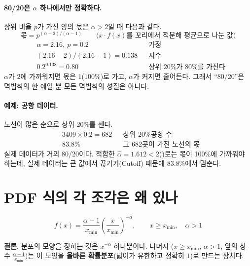 \documentclass[11pt]{article}
\newcommand{\term}[1]{\textbf{#1}}
\begin{document}
\paragraph{80/20은 $\alpha$ 하나에서만 정확하다.} 상위 비율 $p$가 가진 양의 몫은
$\alpha > 2$일 때 다음과 같다.
\[
  \text{몫} = p^{(\alpha-2)/(\alpha-1)}
  \qquad \text{($x \cdot f(x)$를 꼬리에서 적분해 평균으로 나눈 값)}
\]
\begin{align*}
  &\alpha = 2.16,\ p = 0.2              && \text{가정}\\
  &(2.16-2)/(2.16-1) = 0.138            && \text{지수}\\
  &0.2^{0.138} = 0.80                   && \text{상위 20\%가 80\%를 가진다}
\end{align*}
$\alpha$가 $2$에 가까워지면 몫은 $1$(100\%)로 가고, $\alpha$가 커지면 줄어든다.
그래서 ``80/20''은 멱법칙의 한 예일 뿐 모든 멱법칙의 성질은 아니다.

\paragraph{예제: 공항 데이터.} 노선이 많은 순으로 상위 20\%를 센다.
\begin{align*}
  &3409 \times 0.2 = 682          && \text{상위 20\% 공항 수}\\
  &83.8\%                         && \text{그 682곳이 가진 노선의 몫}
\end{align*}
실제 데이터가 거의 80/20이다. 적합한 $\hat\alpha = 1.612 < 2$()로는
몫이 100\%에 가까워야 하는데, 실제 데이터는 큰 값에서 끊기기(Cutoff) 때문에
83.8\%에서 멈춘다.

\section{PDF 식의 각 조각은 왜 있나}
\label{sec:why-pdf}

\[
  f(x) = \frac{\alpha - 1}{x_{\min}} \left(\frac{x}{x_{\min}}\right)^{-\alpha},
  \qquad x \ge x_{\min},\quad \alpha > 1
\]

\textbf{결론.} 분포의 모양을 정하는 것은 $x^{-\alpha}$ 하나뿐이다. 나머지
($x \ge x_{\min}$, $\alpha > 1$, 앞의 상수 $\frac{\alpha-1}{x_{\min}}$)는 이 모양을
\term{올바른 확률분포}(넓이가 유한하고 정확히 $1$)로 만드는 장치다.
\end{document}
